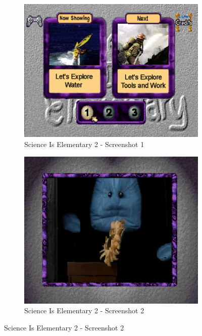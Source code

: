 \begin{figure}[H]
    \centering
    \begin{subfigure}{0.45\textwidth}
        \centering
        \includegraphics[width=\linewidth]{Games/ScienceIsElementary/Images/ScienceIsElementary2Image1.png}
        \caption{Science Is Elementary 2 - Screenshot 1}
    \end{subfigure}
    \begin{subfigure}{0.45\textwidth}
        \centering
        \includegraphics[width=\linewidth]{Games/ScienceIsElementary/Images/ScienceIsElementary2Image2.png}
        \caption{Science Is Elementary 2 - Screenshot 2}
    \end{subfigure}


\end{figure}
